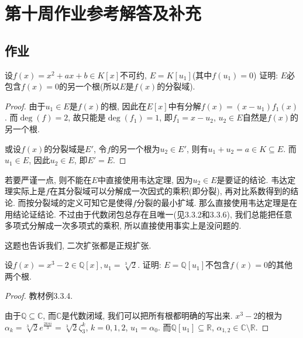 \documentclass{../solutions-cn}
\begin{document}
\section*{第十周作业参考解答及补充}

\subsection*{作业}

\begin{exercise}[习题3.3.1]
    设$f(x) = x^2 + ax + b \in K[x]$不可约, $E = K[u_1]$(其中$f(u_1) = 0$) 证明: $E$必包含$f(x) = 0$的另一个根(所以$E$是$f(x)$的分裂域).
\end{exercise}

\begin{proof}
    由于$u_1 \in E$是$f(x)$的根, 因此在$E[x]$中有分解$f(x) = (x - u_1)f_1(x)$. 而$\deg(f) = 2$, 故只能是$\deg(f_1) = 1$, 即$f_1 = x - u_2$, $u_2 \in E$自然是$f(x)$的另一个根.

    或设$f(x)$的分裂域是$E'$, 令$f$的另一个根为$u_2 \in E'$, 则有$u_1 + u_2 = a \in K \subseteq E$. 而$u_1 \in E$, 因此$u_2 \in E$, 即$E' = E$.
\end{proof}

\begin{remark}
    若要严谨一点, 则不能在$E$中直接使用韦达定理, 因为$u_2 \in E$是要证的结论. 韦达定理实际上是$f$在其分裂域可以分解成一次因式的乘积(即分裂), 再对比系数得到的结论. 而按分裂域的定义可知它是使得$f$分裂的最小扩域. 那么直接使用韦达定理是在用结论证结论. 不过由于代数闭包总存在且唯一(见3.3.2和3.3.6), 我们总能把任意多项式分解成一次多项式的乘积, 所以直接使用事实上是没问题的.

    这题也告诉我们, 二次扩张都是正规扩张.
\end{remark}

\begin{exercise}[习题3.3.2]
    设$f(x) = x^3 - 2 \in \mathbb{Q}[x], u_1 = \sqrt[3]{2}$. 证明: $E = \mathbb{Q}[u_1]$不包含$f(x) = 0$的其他两个根.
\end{exercise}

\begin{proof}
    教材例3.3.4.

    由于$\mathbb{Q} \subseteq \mathbb{C}$, 而$\mathbb{C}$是代数闭域, 我们可以把所有根都明确的写出来. $x^3 - 2$的根为$\alpha_k = \sqrt[3]{2}e^\frac{2k\pi i}{3} = \sqrt[3]{2}\zeta_3^k$, $k = 0, 1, 2$, $u_1 = \alpha_0$. 而$\mathbb{Q}[u_1] \subseteq \mathbb{R}$, $\alpha_{1,2} \in \mathbb{C} \setminus \mathbb{R}$.
\end{proof}
\end{document}
